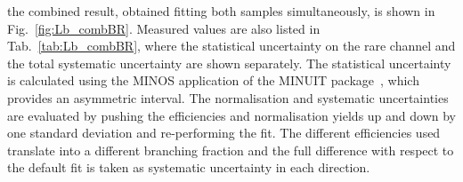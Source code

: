 %
%
%
%
%
%
the combined result, obtained fitting both samples simultaneously, is shown in Fig.~\ref{fig:Lb_combBR}.
Measured values are also listed in Tab.~\ref{tab:Lb_combBR}, where the statistical
uncertainty on the rare channel and the total systematic uncertainty are shown separately.
The statistical uncertainty is calculated using the MINOS application of the MINUIT package~\cite{James:1975dr},
which provides an asymmetric interval.
The normalisation and systematic uncertainties are evaluated by pushing the efficiencies and normalisation yields
up and down by one standard deviation and re-performing the fit.
The different efficiencies used translate into a different branching fraction and the full difference with respect 
to the default fit is taken as systematic uncertainty in each direction.


